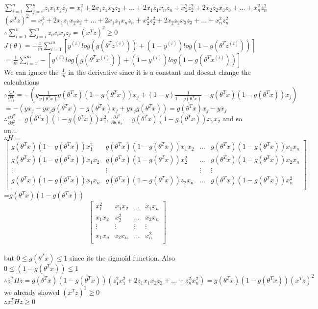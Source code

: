 \begin{answer}\\
$\sum_{i=1}^{n}\sum_{j=i}^{n}z_ix_ix_jz_j=x_i^2+2x_1z_1x_2z_2+\dots+2x_1z_1x_nz_n+x_2^2z_2^2+2x_2z_2x_3z_3+\dots+x_n^2z_n^2$\\
$(x^Tz)^2=x_i^2+2x_1z_1x_2z_2+\dots+2x_1z_1x_nz_n+x_2^2z_2^2+2x_2z_2x_3z_3+\dots+x_n^2z_n^2$\\
$\therefore \sum_{i=1}^{n}\sum_{j=i}^{n}z_ix_ix_jz_j=(x^Tz)^2 \geq 0$\\
$J(\theta)=-\frac{1}{m}\sum_{i=1}^{m}\left[ y^{(i)}log(g(\theta^T z^{(i)})) + (1-y^{(i)})log(1-g(\theta^T z^{(i)})) \right]$\\
$=\frac{1}{m}\sum_{i=1}^{m} - \left[ y^{(i)}log(g(\theta^T x^{(i)})) + (1-y^{(i)})log(1-g(\theta^T x^{(i)})) \right]$\\
We can ignore the $\frac{1}{m}$ in the derivative since it is a constant and doesnt change the calculations\\
$\therefore \frac{\partial J}{\partial \theta_j}=-(y \frac{1}{g(\theta^T x)}g(\theta^T x)(1-g(\theta^T x))x_j + (1-y)\frac{1}{1-g(\theta^T x)}-g(\theta^T x)(1-g(\theta^T x))x_j)$
$=-(yx_j-yx_jg(\theta^T x)-g(\theta^T x)x_j +yx_jg(\theta^T x))= g(\theta^T x)x_j -yx_j$\\

$\therefore \frac{\partial J^2}{\partial \theta_1^2}=g(\theta^T x)(1-g(\theta^T x))x_1^2$, $\frac{\partial J^2}{\partial \theta_1\theta_2}=g(\theta^T x)(1-g(\theta^T x))x_1x_2$ and so on...\\
$\therefore H=$
\[
\begin{bmatrix}
g(\theta^T x)(1-g(\theta^T x))x_1^2 & g(\theta^T x)(1-g(\theta^T x))x_1x_2 & \dots & g(\theta^T x)(1-g(\theta^T x))x_1x_n \\
g(\theta^T x)(1-g(\theta^T x))x_1x_2 & g(\theta^T x)(1-g(\theta^T x))x_2^2 & \dots & g(\theta^T x)(1-g(\theta^T x))x_2x_n \\
\vdots & \vdots & \vdots  & \vdots \\
g(\theta^T x)(1-g(\theta^T x))x_1x_n & g(\theta^T x)(1-g(\theta^T x))z_2x_n & \dots & g(\theta^T x)(1-g(\theta^T x))x_n^2 \\
\end{bmatrix}
\]=$g(\theta^T x)(1-g(\theta^T x))$
\[
\begin{bmatrix}
x_1^2 & x_1x_2 & \dots & x_1x_n \\
x_1x_2 & x_2^2 & \dots & x_2x_n \\
\vdots & \vdots & \vdots  & \vdots \\
x_1x_n & z_2x_n & \dots & x_n^2 \\
\end{bmatrix}
\]\\
but $0 \leq g(\theta^T x) \leq 1$ since its the sigmoid function. Also $0 \leq (1-g(\theta^T x)) \leq1$\\
$\therefore z^THz=g(\theta^T x)(1-g(\theta^T x))(z_1^2x_1^2+2z_1x_1x_2z_2+\dots+z_n^2x_n^2)=g(\theta^T x)(1-g(\theta^T x))(x^Tz)^2$\\
we already showed $(x^Tz)^2 \geq 0$\\
$\therefore z^THz \geq 0$
\end{answer}